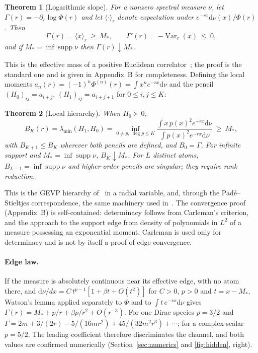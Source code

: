 \documentclass[11pt]{article}
\newtheorem{theorem}{Theorem}
\theoremstyle{definition}
\theoremstyle{remark}
\newcommand{\Mstar}{M_{*}}
\newcommand{\dnu}{\mathrm{d}\nu}
\DeclareMathOperator{\supp}{supp}
\DeclareMathOperator{\Var}{Var}
\begin{document}
\begin{theorem}[Logarithmic slope]\label{thm:C}
For a nonzero spectral measure $\nu$, let
$\Gamma(r)=-\partial_{r}\log\Phi(r)$ and let $\langle\cdot\rangle_{r}$
denote expectation under $e^{-rx}\dnu(x)/\Phi(r)$. Then
\begin{equation}
\Gamma(r)=\langle x\rangle_{r}\ \ge\ \Mstar,
\qquad
\Gamma'(r)=-\Var_{r}(x)\ \le\ 0,
\end{equation}
and if $\Mstar=\inf\supp\nu$ then $\Gamma(r)\downarrow\Mstar$.
\end{theorem}

This is the effective mass of a positive Euclidean
correlator~\cite{luscher_wolff_1990}; the proof is the standard one and is
given in Appendix~B for completeness. Defining the local moments
$a_{n}(r)=(-1)^{n}\Phi^{(n)}(r)=\int x^{n}e^{-rx}\dnu$ and the pencil
$(H_{0})_{ij}=a_{i+j}$, $(H_{1})_{ij}=a_{i+j+1}$ for $0\le i,j\le K$:

\begin{theorem}[Local hierarchy]\label{thm:E}
When $H_{0}\succ0$,
\begin{equation}
B_{K}(r)=\lambda_{\min}(H_{1},H_{0})
=\inf_{0\neq p,\ \deg p\le K}
\frac{\int x\,p(x)^{2}e^{-rx}\dnu}{\int p(x)^{2}e^{-rx}\dnu}
\ \ge\ \Mstar,
\end{equation}
with $B_{K+1}\le B_{K}$ wherever both pencils are defined, and $B_{0}=\Gamma$.
For infinite support and $\Mstar=\inf\supp\nu$, $B_{K}\downarrow\Mstar$.
For $L$ distinct atoms, $B_{L-1}=\inf\supp\nu$ and higher-order pencils are
singular; they require rank reduction.
\end{theorem}

This is the GEVP hierarchy of~\cite{blossier_et_al_gevp_2009} in a radial
variable, and, through the Pad\'e--Stieltjes correspondence, the same machinery
used in~\cite{masjuan_peris_2009}. The convergence proof (Appendix~B) is
self-contained: determinacy follows from Carleman's criterion, and the approach
to the support edge from density of polynomials in $L^{2}$ of a measure
possessing an exponential moment. Carleman is used only for determinacy and
is not by itself a proof of edge convergence.

\paragraph{Edge law.}
If the measure is absolutely continuous near its effective edge, with no atom
there, and $\dnu/dx=C\,t^{p-1}[1+\beta t+O(t^{2})]$ for $C>0$, $p>0$ and
$t=x-\Mstar$, Watson's lemma
applied separately to $\Phi$ and to $\int t\,e^{-rx}\dnu$ gives
$\Gamma(r)=\Mstar+p/r+\beta p/r^{2}+O(r^{-3})$. For one Dirac species
$p=3/2$ and $\Gamma=2m+3/(2r)-5/(16mr^{2})+45/(32m^{2}r^{3})+\cdots$; for a
complex scalar $p=5/2$. The leading coefficient therefore discriminates the
channel, and both values are confirmed numerically
(Section~\ref{sec:numerics} and \cref{fig:hidden}, right).
\end{document}
